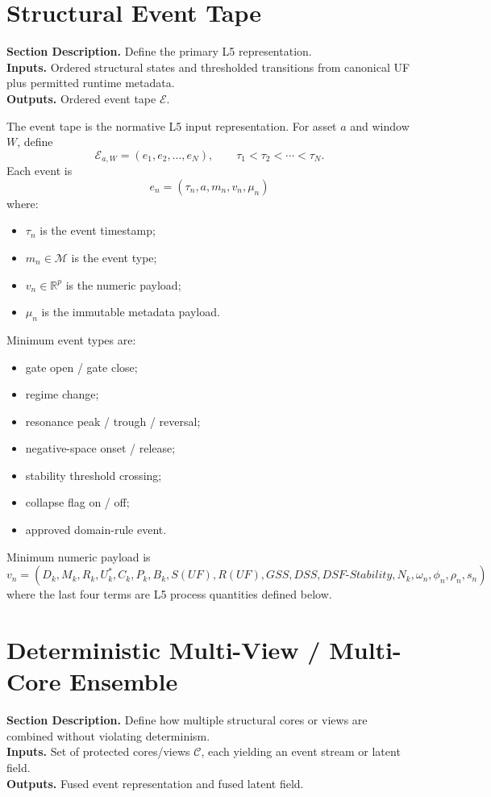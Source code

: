 \documentclass[11pt]{report}
\newcommand{\R}{\mathbb{R}}
\newcommand{\E}{\mathcal{E}}
\newcommand{\meta}[3]{\textbf{Section Description.} #1\\
\textbf{Inputs.} #2\\
\textbf{Outputs.} #3\par}
\begin{document}
\section{Structural Event Tape}
\meta{Define the primary L5 representation.}{Ordered structural states and thresholded transitions from canonical UF plus permitted runtime metadata.}{Ordered event tape $\E$.}

The event tape is the normative L5 input representation. For asset $a$ and window $W$, define
\[
\E_{a,W}=(e_1,e_2,\dots,e_N),\qquad \tau_1<\tau_2<\cdots<\tau_N.
\]
Each event is
\[
e_n=(\tau_n,a,m_n,v_n,\mu_n)
\]
where:
\begin{itemize}
    \item $\tau_n$ is the event timestamp;
    \item $m_n\in\mathcal{M}$ is the event type;
    \item $v_n\in\R^{p}$ is the numeric payload;
    \item $\mu_n$ is the immutable metadata payload.
\end{itemize}

Minimum event types are:
\begin{itemize}
    \item gate open / gate close;
    \item regime change;
    \item resonance peak / trough / reversal;
    \item negative-space onset / release;
    \item stability threshold crossing;
    \item collapse flag on / off;
    \item approved domain-rule event.
\end{itemize}

Minimum numeric payload is
\[
v_n = (D_k,M_k,R_k,U_k^{\ast},C_k,P_k,B_k,S(UF),R(UF),GSS,DSS,DSF\text{-}Stability,N_k,\omega_n,\phi_n,\rho_n,s_n)
\]
where the last four terms are L5 process quantities defined below.

\section{Deterministic Multi-View / Multi-Core Ensemble}
\meta{Define how multiple structural cores or views are combined without violating determinism.}{Set of protected cores/views $\mathcal{C}$, each yielding an event stream or latent field.}{Fused event representation and fused latent field.}
\end{document}
